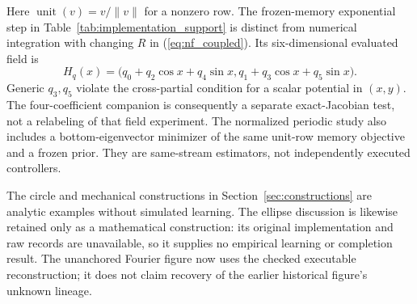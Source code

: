Here $\operatorname{unit}(v)=v/\|v\|$ for a nonzero row.
The frozen-memory exponential step in Table~\ref{tab:implementation_support}
is distinct from numerical integration with changing $R$ in
(\ref{eq:nf_coupled}). Its six-dimensional evaluated field is
\begin{equation}
 H_q(x)=\bigl(q_0+q_2\cos x+q_4\sin x,
                q_1+q_3\cos x+q_5\sin x\bigr).
\end{equation}
Generic $q_3,q_5$ violate the cross-partial condition for a scalar
potential in $(x,y)$. The four-coefficient companion is consequently a
separate exact-Jacobian test, not a relabeling of that field experiment.
The normalized periodic study also includes a bottom-eigenvector minimizer
of the same unit-row memory objective and a frozen prior. They are
same-stream estimators, not independently executed controllers.

The circle and mechanical constructions in
Section~\ref{sec:constructions} are analytic examples without simulated
learning. The ellipse discussion is likewise retained only as a mathematical
construction: its original implementation and raw records are unavailable,
so it supplies no empirical learning or completion result. The unanchored
Fourier figure now uses the checked executable reconstruction; it does not
claim recovery of the earlier historical figure's unknown lineage.

